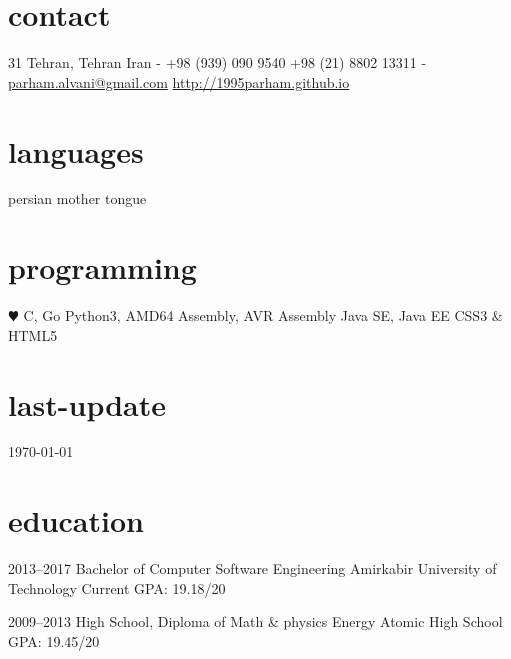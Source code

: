 \documentclass[]{friggeri-cv} %
\begin{document}


\begin{aside} %
\section{contact}
31
Tehran, Tehran
Iran
-
+98 (939) 090 9540
+98 (21) 8802 13311
-
\href{mailto:parham.alvani@gmail.com}{parham.alvani@gmail.com}
\href{http://1995parham.github.io/}{http://1995parham.github.io}
\section{languages}
persian mother tongue
\section{programming}
{\color{red} $\varheartsuit$} C, Go
Python3, AMD64 Assembly, AVR Assembly
Java SE, Java EE
CSS3 \& HTML5
\section{last-update}
\today
\end{aside}


\section{education}

\begin{entrylist}


\entry
{2013--2017}
{Bachelor {\normalfont of Computer Software Engineering}}
{Amirkabir University of Technology}
{Current GPA: 19.18/20}


\entry
{2009--2013}
{High School, {\normalfont Diploma of Math \& physics}}
{Energy Atomic High School}
{GPA: 19.45/20}



\end{entrylist}
\end{document}
